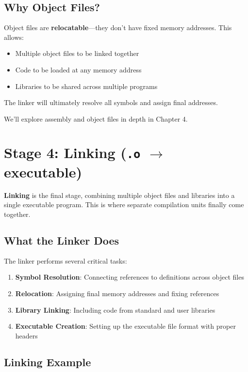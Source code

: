\subsection{Why Object Files?}

Object files are \textbf{relocatable}—they don't have fixed memory addresses. This allows:
\begin{itemize}
    \item Multiple object files to be linked together
    \item Code to be loaded at any memory address
    \item Libraries to be shared across multiple programs
\end{itemize}

The linker will ultimately resolve all symbols and assign final addresses.

We'll explore assembly and object files in depth in Chapter 4.

\section{Stage 4: Linking (\texttt{.o} $\to$ executable)}

\textbf{Linking} is the final stage, combining multiple object files and libraries into a single executable program. This is where separate compilation units finally come together.

\subsection{What the Linker Does}

The linker performs several critical tasks:

\begin{enumerate}
    \item \textbf{Symbol Resolution}: Connecting references to definitions across object files
    \item \textbf{Relocation}: Assigning final memory addresses and fixing references
    \item \textbf{Library Linking}: Including code from standard and user libraries
    \item \textbf{Executable Creation}: Setting up the executable file format with proper headers
\end{enumerate}

\subsection{Linking Example}

